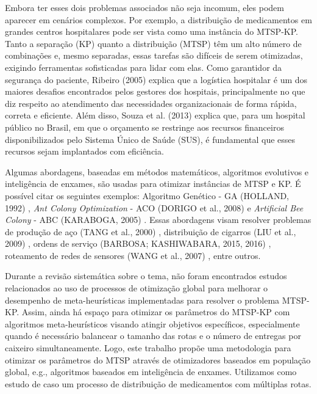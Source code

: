 Embora ter esses dois problemas associados não seja incomum, eles podem aparecer em cenários complexos. Por exemplo, a distribuição de medicamentos em grandes centros hospitalares pode ser vista como uma instância do MTSP-KP. Tanto a separação (KP) quanto a distribuição (MTSP) têm um alto número de combinações e, mesmo separadas, essas tarefas são difíceis de serem otimizadas, exigindo ferramentas sofisticadas para lidar com elas. Como garantidor da segurança do paciente, Ribeiro (2005) \cite{ribeiro_2005} explica que a logística hospitalar é um dos maiores desafios encontrados pelos gestores dos hospitais, principalmente no que diz respeito ao atendimento das necessidades organizacionais de forma rápida, correta e eficiente. Além disso, Souza et al. (2013) \cite{de2013logistica} explica que, para um hospital público no Brasil, em que o orçamento se restringe aos recursos financeiros disponibilizados pelo Sistema Único de Saúde (SUS), é fundamental que esses recursos sejam implantados com eficiência.

Algumas abordagens, baseadas em métodos matemáticos, algoritmos evolutivos e inteligência de enxames, são usadas para otimizar instâncias de MTSP e KP. É possível citar os seguintes exemplos: Algoritmo Genético - GA (HOLLAND, 1992) \cite{holland1992genetic}, \textit{Ant Colony Optimization} - ACO (DORIGO et al., 2008) \cite{dorigo2008particle} e \textit{Artificial Bee Colony} - ABC (KARABOGA, 2005) \cite{karaboga2005idea}. Essas abordagens visam resolver problemas de produção de aço (TANG et al., 2000) \cite{tang2000multiple}, distribuição de cigarros (LIU et al., 2009) \cite{liu2009ant}, ordens de serviço (BARBOSA; KASHIWABARA, 2015, 2016) \cite{barbosa2015aplicaccao, barbosa2016aplicaccao}, roteamento de redes de sensores (WANG et al., 2007) \cite{wang2007hierarchical}, entre outros.

Durante a revisão sistemática sobre o tema, não foram encontrados estudos relacionados ao uso de processos de otimização global para melhorar o desempenho de meta-heurísticas implementadas para resolver o problema MTSP-KP. Assim, ainda há espaço para otimizar os parâmetros do MTSP-KP com algoritmos meta-heurísticos visando atingir objetivos específicos, especialmente quando é necessário balancear o tamanho das rotas e o número de entregas por caixeiro simultaneamente. Logo, este trabalho propõe uma metodologia para otimizar os parâmetros do MTSP através de otimizadores baseados em população global, e.g., algoritmos baseados em inteligência de enxames. Utilizamos como estudo de caso um processo de distribuição de medicamentos com múltiplas rotas.

